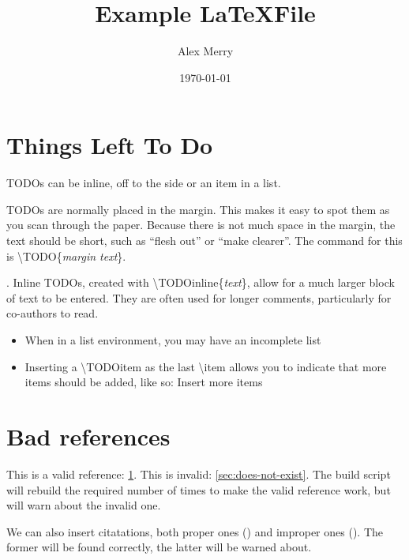 \documentclass[a4paper]{article}
\title{Example \LaTeX File}
\author{Alex Merry}
\date{\today}
\begin{document}
\maketitle

\section{Things Left To Do}
\label{sec:todo}

TODOs can be inline, off to the side or an item in a list.

TODOs are normally placed in the margin.  This makes it easy to spot
them as you scan through the paper.  Because there is not much space in
the margin, the text should be short, such as ``flesh out'' or ``make
clearer''.  The command for this is \textbackslash{}TODO\{\textit{margin
text}\}.

.  Inline TODOs, created
with \textbackslash{}TODOinline\{\textit{text}\}, allow for a much
larger block of text to be entered.  They are often used for longer
comments, particularly for co-authors to read.

\begin{itemize}
\item When in a list environment, you may have an incomplete list
\item Inserting a \textbackslash{}TODOitem as the last
\textbackslash{}item allows you to indicate that more items should be
added, like so:
\TODOitem Insert more items
\end{itemize}


\section{Bad references}

This is a valid reference: \ref{sec:todo}.  This is invalid:
\ref{sec:does-not-exist}.  The build script will rebuild the required
number of times to make the valid reference work, but will warn about
the invalid one.

We can also insert citatations, both proper ones (\cite{valid}) and
improper ones (\cite{no-such-cite}).  The former will be found
correctly, the latter will be warned about.



\end{document}

